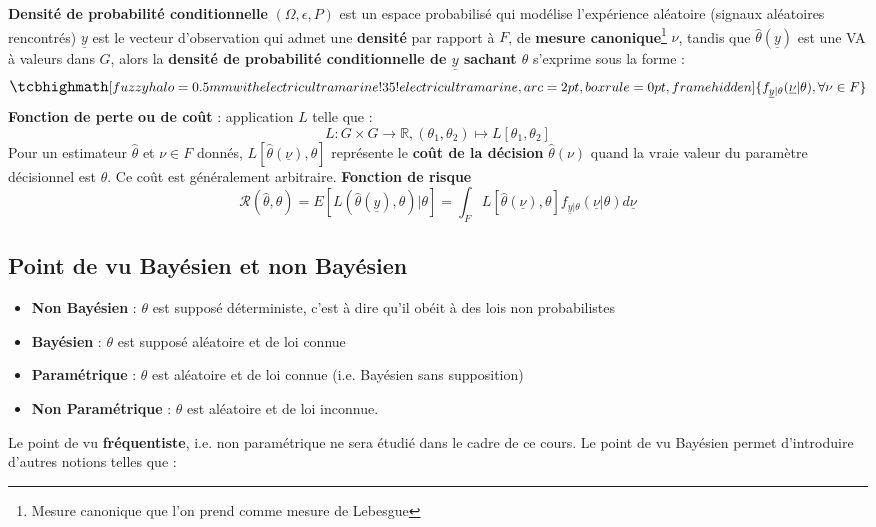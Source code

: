 \noindent \textbf{Densité de probabilité conditionnelle} \newline
\noindent $(\Omega, \epsilon, P)$ est un espace probabilisé qui modélise l'expérience aléatoire (signaux aléatoires rencontrés) \newline
\noindent $\underline{y}$ est le vecteur d'observation qui admet une \textbf{densité} par rapport à $F$, de \textbf{mesure canonique}\footnote{Mesure canonique que l'on prend comme mesure de Lebesgue} $\nu$, tandis que $\widehat{\theta}(\underline{y})$ est une VA à valeurs dans $G$, alors la \textbf{densité de probabilité conditionnelle de $\underline{y}$ sachant $\theta$ } s'exprime sous la forme :
\begin{equation}
    \large
    \tcbhighmath[fuzzy halo=0.5mm with electricultramarine!35!electricultramarine,arc=2pt,
    boxrule=0pt,frame hidden]{ 
        f_{\underline{y}|\theta}(\underline{\nu}|\theta), \forall \nu \in F
     } \nonumber
    \normalsize
\end{equation}
\textbf{Fonction de perte ou de coût} : application $L$ telle que :
\begin{equation}
    L : G \times G \longrightarrow \mathbb{R}, (\theta_{1},\theta_{2}) \mapsto L[\theta_{1},\theta_{2}] \nonumber
\end{equation}
Pour un estimateur $\widehat{\theta}$ et $\nu \in F$ donnés,  $L[\widehat{\theta}(\underline{\nu}), \theta]$ représente le \textbf{coût de la décision} $\widehat{\theta}(\nu)$ quand la vraie valeur du paramètre décisionnel est $\theta$. Ce coût est généralement arbitraire. \newline
\textbf{Fonction de risque}
\begin{equation}
    \mathcal{R}(\widehat{\theta},\theta) = E[L(\widehat{\theta}(\underline{y}),\theta)|\theta] = \int_{F}{L[\widehat{\theta}(\underline{\nu}), \theta]f_{\underline{y}|\theta}(\underline{\nu}|\theta)}{d\underline{\nu}} \nonumber
\end{equation}
\newpage
\subsection{Point de vu Bayésien et non Bayésien}
\begin{itemize}
    \item \textbf{Non Bayésien} : $\theta$ est supposé déterministe, c'est à dire qu'il obéit à des lois non probabilistes \newline
    \item \textbf{Bayésien} : $\theta$ est supposé aléatoire et de loi connue \newline
    \item \textbf{Paramétrique} : $\theta$ est aléatoire et de loi connue (i.e. Bayésien sans supposition) \newline
    \item \textbf{Non Paramétrique} : $\theta$ est aléatoire et de loi inconnue. \newline
\end{itemize}
\noindent Le point de vu \textbf{fréquentiste}, i.e. non paramétrique ne sera étudié dans le cadre de ce cours. Le point de vu Bayésien permet d'introduire d'autres notions telles que : \newline

